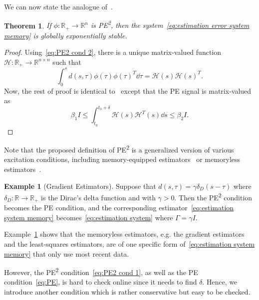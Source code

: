 \documentclass[]{IEEEtran}
\newtheorem{theorem}{Theorem}
\theoremstyle{definition}
\newtheorem{example}{Example}
\theoremstyle{remark}
\newcommand{\MB}[1]{\mathbb{#1}}
\newcommand{\MC}[1]{\mathcal{#1}}
\newcommand{\tsup}[1]{\textsuperscript{#1}}
\begin{document}
We can now state the analogue of~\cite[Theorem~1]{anderson_exponential_1977}.

\begin{theorem}\label{thm:PE2 then GES}
	If $\phi: \MB{R}_{+} \to \MB{R}^n$ is PE\tsup{2}, then the
	system~\eqref{eq:estimation error system memory} is globally exponentially
	stable.
\end{theorem}

\begin{proof}
	Using~\eqref{eq:PE2 cond 2}, there is a unique matrix-valued function $\MC{H}
	: \MB{R}_{+} \to \MB{R}^{n \times n}$ such that
	\begin{equation*}
		\int_0^s d(s, \tau) \phi(\tau) \phi(\tau)^T \dd{\tau} = \MC{H}(s)
		\MC{H}(s)^T.
	\end{equation*}
	Now, the rest of proof is identical
	to~\cite[Theorem~1]{anderson_exponential_1977} except that the PE signal is
	matrix-valued as
	\begin{equation*}
		\beta_1 I \le \int_{t_0}^{t_0 + \delta} \MC{H}(s) \MC{H}^T(s) \dd{s}
		\le \beta_2 I.
	\end{equation*}
\end{proof}

Note that the proposed definition of PE\tsup{2} is a generalized version of
various excitation conditions, including memory-equipped
estimators~\cite{chowdhary_exponential_2014, pan_composite_2018,
	cho_composite_2018} or memoryless estimators~\cite{anderson_exponential_1977,
slotine_composite_1989}.

\begin{example}[Gradient Estimators]
	\label{ex:gradient estimators}
	Suppose that $d(s, \tau) = \gamma \delta_D(s -
	\tau)$ where $\delta_D : \MB{R} \to \MB{R}_{+}$ is the Dirac's delta function
	and with $\gamma > 0$. Then the PE\tsup{2} condition becomes the PE condition,
	and the corresponding estimator~\eqref{eq:estimation system memory}
	becomes~\eqref{eq:estimation system} where $\Gamma = \gamma I$.
\end{example}

Example~\ref{ex:gradient estimators} shows that the memoryless estimators, e.g.
the gradient estimators and the least-squares estimators, are of one specific
form of~\eqref{eq:estimation system memory} that only use most recent data.

However, the PE\tsup{2} condition~\eqref{eq:PE2 cond 1}, as well as the PE
condition~\eqref{eq:PE}, is hard to check online since it needs to find
$\delta$. Hence, we introduce another condition which is rather
conservative but easy to be checked.
\end{document}
